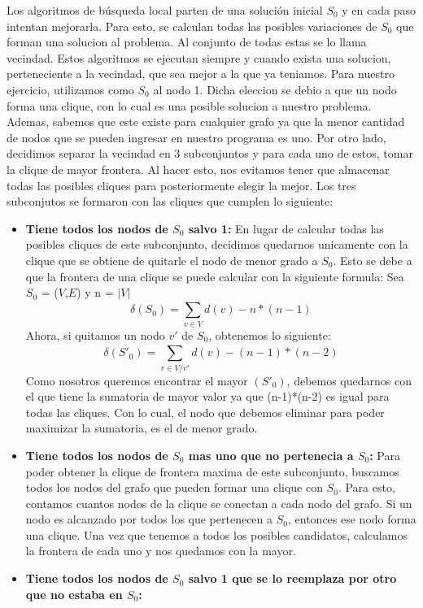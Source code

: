 Los algoritmos de búsqueda local parten de una solución inicial $S_{0}$ y en cada paso intentan mejorarla. Para esto, se calculan todas las posibles variaciones de $S_{0}$ que forman una solucion al problema. Al conjunto de todas estas se lo llama vecindad. 
Estos algoritmos se ejecutan siempre y cuando exista una solucion, perteneciente a la vecindad, que sea mejor a la que ya teniamos. \newline \newline
Para nuestro ejercicio, utilizamos como $S_{0}$ al nodo 1. Dicha eleccion se debio a que un nodo forma una clique, con lo cual es una posible solucion a nuestro problema. Ademas, sabemos que este existe para cualquier grafo ya que la menor cantidad de nodos que se pueden ingresar en nuestro programa es uno. 
\newline Por otro lado, decidimos separar la vecindad en 3 subconjuntos y para cada uno de estos, tomar la clique de mayor frontera. Al hacer esto, nos evitamos tener que almacenar todas las posibles cliques para posteriormente elegir la mejor. Los tres subconjutos se formaron con las cliques que cumplen lo siguiente:
\begin{itemize}
\item \textbf{Tiene todos los nodos de $S_{0}$ salvo 1:} \newline En lugar de calcular todas las posibles cliques de este subconjunto, decidimos quedarnos unicamente con la clique que se obtiene de quitarle el nodo de menor grado a $S_{0}$. Esto se debe a que la frontera de una clique se puede calcular con la siguiente formula:\newline
Sea $S_{0}$ = ($V$,$E$) y n = $|$$V$$|$
\begin{equation}
  \delta(S_{0}) = \sum_{v \in V}^{} d(v) - n*(n-1)
\end{equation}
Ahora, si quitamos un nodo $v'$ de $S_{0}$, obtenemos lo siguiente:
\begin{equation}
  \delta(S'_{0}) = \sum_{v \in V/v'}^{} d(v) - (n-1)*(n-2)
\end{equation}
Como nosotros queremos encontrar el mayor \delta$(S'_{0})$, debemos quedarnos con el que tiene la sumatoria de mayor valor ya que (n-1)*(n-2) es igual para todas las cliques. Con lo cual, el nodo que debemos eliminar para poder maximizar la sumatoria, es el de menor grado.
\item \textbf{Tiene todos los nodos de $S_{0}$ mas uno que no pertenecia a $S_{0}$:} \newline
Para poder obtener la clique de frontera maxima de este subconjunto, buscamos todos los nodos del grafo que pueden formar una clique con $S_{0}$. Para esto, contamos cuantos nodos de la clique se conectan a cada nodo del grafo. Si un nodo es alcanzado por todos los que pertenecen a $S_{0}$, entonces ese nodo forma una clique. Una vez que tenemos a todos los posibles candidatos, calculamos la frontera de cada uno y nos quedamos con la mayor.
\item \textbf{Tiene todos los nodos de $S_{0}$ salvo 1 que se lo reemplaza por otro que no estaba en $S_{0}$:} \newline
\end{itemize}
